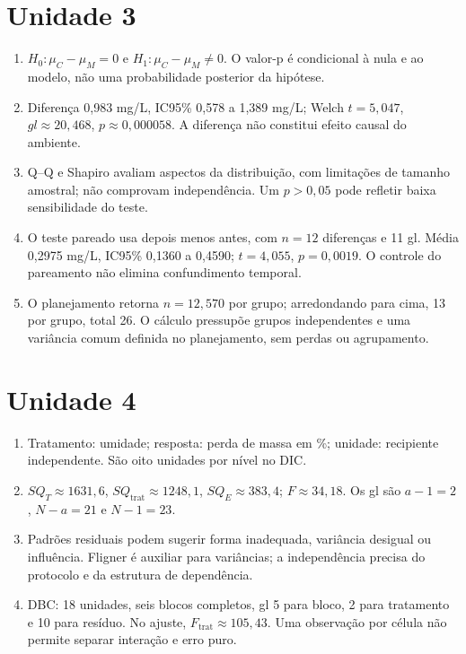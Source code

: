 \section*{Unidade 3}
\begin{enumerate}
\item $H_0:\mu_C-\mu_M=0$ e $H_1:\mu_C-\mu_M\ne0$. O valor-p é condicional à nula e ao modelo, não uma probabilidade posterior da hipótese.
\item Diferença 0,983 mg/L, IC95\% 0,578 a 1,389 mg/L; Welch $t=5{,}047$, $gl\approx20{,}468$, $p\approx0{,}000058$. A diferença não constitui efeito causal do ambiente.
\item Q--Q e Shapiro avaliam aspectos da distribuição, com limitações de tamanho amostral; não comprovam independência. Um $p>0{,}05$ pode refletir baixa sensibilidade do teste.
\item O teste pareado usa depois menos antes, com $n=12$ diferenças e 11 gl. Média 0,2975 mg/L, IC95\% 0,1360 a 0,4590; $t=4{,}055$, $p=0{,}0019$. O controle do pareamento não elimina confundimento temporal.
\item O planejamento retorna $n=12{,}570$ por grupo; arredondando para cima, 13 por grupo, total 26. O cálculo pressupõe grupos independentes e uma variância comum definida no planejamento, sem perdas ou agrupamento.
\end{enumerate}

\section*{Unidade 4}
\begin{enumerate}
\item Tratamento: umidade; resposta: perda de massa em \%; unidade: recipiente independente. São oito unidades por nível no DIC.
\item $SQ_T\approx1631{,}6$, $SQ_{\mathrm{trat}}\approx1248{,}1$, $SQ_E\approx383{,}4$; $F\approx34{,}18$. Os gl são $a-1=2$, $N-a=21$ e $N-1=23$.
\item Padrões residuais podem sugerir forma inadequada, variância desigual ou influência. Fligner é auxiliar para variâncias; a independência precisa do protocolo e da estrutura de dependência.
\item DBC: 18 unidades, seis blocos completos, gl 5 para bloco, 2 para tratamento e 10 para resíduo. No ajuste, $F_{\mathrm{trat}}\approx105{,}43$. Uma observação por célula não permite separar interação e erro puro.
\end{enumerate}

